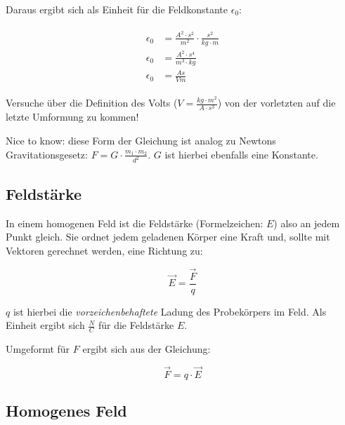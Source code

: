Daraus ergibt sich als Einheit für die Feldkonstante $\epsilon_0$:

\begin{align}\label{eq:feldkonstante_einheiten}
\begin{split}
	\epsilon_0 &= \frac{A^{2} \cdot s^{2}}{m^{2}} \cdot \frac{s^{2}}{kg \cdot m} \\
	\epsilon_0 &= \frac{A^{2} \cdot s^{4}}{m^{3} \cdot kg} \\
	\epsilon_0 &= \frac{As}{Vm}
\end{split}
\end{align}

\begin{Aufgabe}
Versuche über die Definition des Volts ($V=\frac{kg \cdot m^2}{A \cdot s^3}$) von der vorletzten auf die letzte Umformung zu kommen!
\end{Aufgabe}

\begin{leftbar}
Nice to know: diese Form der Gleichung ist analog zu Newtons Gravitationsgesetz: $F = G \cdot \frac{m_1 \cdot m_2}{d^2}$. $G$ ist hierbei ebenfalls eine Konstante.
\end{leftbar}



\subsection{Feldstärke}  \label{subsec:Feldstaerke}

In einem homogenen Feld ist die Feldstärke (Formelzeichen: $E$) also an jedem Punkt gleich. Sie ordnet jedem geladenen Körper eine Kraft und, sollte mit Vektoren gerechnet werden, eine Richtung zu:

\begin{equation} \label{eq:feldstaerke}
	\vec{E} = \frac{\vec{F}}{q}
\end{equation}

$q$ ist hierbei die \emph{vorzeichenbehaftete} Ladung des Probekörpers im Feld. Als Einheit ergibt sich $\frac{N}{C}$ für die Feldstärke $E$. 

Umgeformt für $F$ ergibt sich aus der Gleichung:

\begin{equation} \label{eq:feldstaerke_nach_F}
	\vec{F} = q \cdot \vec{E}
\end{equation}


\subsection{Homogenes Feld} \label{subsec:EFeldHomogen}

